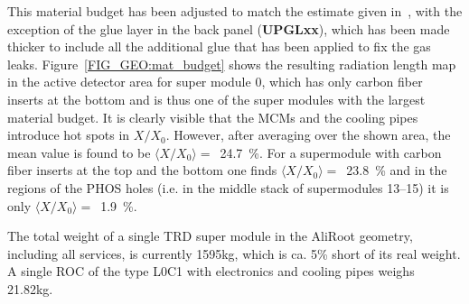\documentclass{alicetdr}
\begin{document}
This material budget has been adjusted to match the estimate given
in~\cite{CLEMENS}, with the exception of the glue layer in the back panel
({\bf UPGLxx}), which has been made thicker to include all the additional
glue that has been applied to fix the gas leaks.  Figure~\ref{FIG_GEO:mat_budget}
shows the resulting radiation length map in the active detector area for
super module 0, which has only carbon fiber inserts at the bottom and is
thus one of the super modules with the largest material budget.  It is
clearly visible that the MCMs and the cooling pipes introduce hot spots
in $X/X_{0}$.  However, after averaging over the shown area, the mean
value is found to be $\langle X/X_{0}\rangle =$~24.7~\%.  For a supermodule
with carbon fiber inserts at the top and the bottom one finds
$\langle X/X_{0}\rangle =$~23.8~\% and in the regions of the PHOS holes (i.e.
in the middle stack of supermodules 13--15) it is only
$\langle X/X_{0}\rangle =$~1.9~\%.

The total weight of a single TRD super module in the AliRoot geometry,
including all services, is currently 1595kg, which is ca. 5\% short of its
real weight.  A single ROC of the type L0C1 with electronics and cooling
pipes weighs 21.82kg.
%
\end{document}
